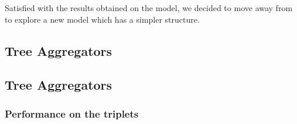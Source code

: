 Satisfied with the results obtained on the model, we decided to move away from \rfs to explore a new
model which has a simpler structure.

\subsection{Tree Aggregators}


%
%


\subsection{Tree Aggregators}

\subsubsection{Performance on the triplets}
